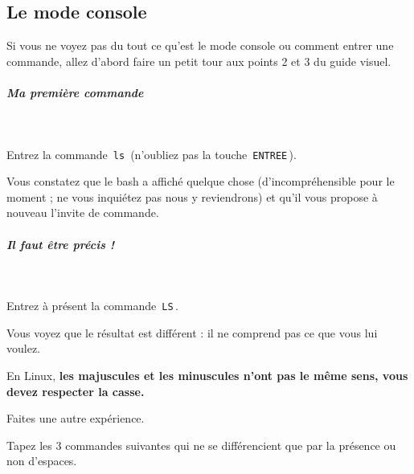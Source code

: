 \documentclass[11pt,a4paper]{article}
\begin{document}
				\subsection{Le mode console}
					Si vous ne voyez pas du tout ce qu'est le mode console ou comment entrer une commande, 
					allez d'abord faire un petit tour aux points 2 et 3 du guide visuel.
				
            \par
        
			
		\subparagraph{Ma premi\`ere commande} 
		
					\textcolor{white}{.} \par
				
            \par
        
					Entrez la commande \,\verb|ls|\,
					(n'oubliez pas la touche \,\verb|ENTREE|\,).
				
            \par
        
					Vous constatez que le bash a affich\'e quelque chose 
					(d'incompr\'ehensible pour le moment ; ne vous inqui\'etez pas nous y reviendrons)
					et qu'il vous propose \`a nouveau l'invite de commande.
				
            \par
        
			
		\subparagraph{Il faut \^etre pr\'ecis !} 
		
					\textcolor{white}{.} \par
				
            \par
        
					Entrez \`a pr\'esent  la commande \,\verb|LS|\,.
				
            \par
        
					Vous voyez que le r\'esultat est diff\'erent : il ne comprend pas ce que vous lui voulez.
        
            \par
        
					En Linux, \textbf{les majuscules et les minuscules n'ont pas le m\^eme sens, vous devez respecter la casse.}
            \par
        
					Faites une autre exp\'erience. 
        
            \par
        
					Tapez les 3 commandes suivantes qui ne se diff\'erencient que par la pr\'esence ou non d'espaces.
				
\end{document}
